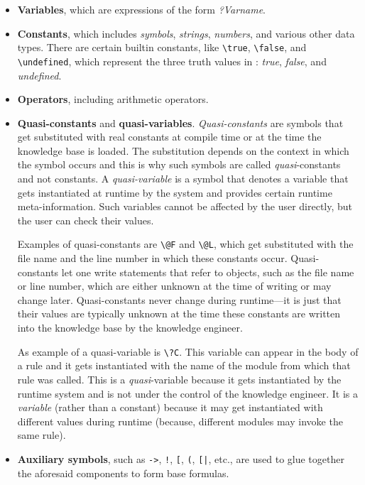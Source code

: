 \documentclass[11pt]{article}
\newcommand{\ERGO}{\mbox{\smaller{\ensuremath{\cal{E}}\smaller{{\sc{RGO}}}}}\xspace}
\newcommand{\FLSYSTEM}{\ERGO}
\newcommand{\bs}{\textbackslash}
\begin{document}
\begin{itemize}
\item  \textbf{Variables}, which are expressions of the form \emph{?Varname}.
  \index{\bs{}true}
  \index{\bs{}false}
  \index{\bs{}undefined}
\item  \textbf{Constants}, which includes \emph{symbols},  \emph{strings},
  \emph{numbers}, and various other data types.
  There are certain builtin constants, like \texttt{\bs{}true},
  \texttt{\bs{}false}, and \texttt{\bs{}undefined}, which represent the
  three truth values in \FLSYSTEM: \emph{true}, \emph{false}, and \emph{undefined}.    
\item \textbf{Operators}, including arithmetic operators.
\item \textbf{Quasi-constants} and
  \textbf{quasi-variables}. \emph{Quasi-constants}
  are symbols that get substituted
  with real constants at compile time or at the time the knowledge base is
  loaded. The substitution depends on the context in which the symbol
  occurs and this is why such symbols are called \emph{quasi}-constants and
  not constants. 
  A \emph{quasi-variable} is a symbol that denotes a variable that gets
  instantiated at runtime by the system and provides certain runtime
  meta-information. Such variables cannot be affected by the user directly,
  but the user can check their values.
  
  Examples of quasi-constants are \texttt{\bs{}@F} and \texttt{\bs{}@L},
  which get substituted with the file name and the line number in which
  these constants occur. Quasi-constants let one write
  statements that refer to objects, such as the file name or line
  number, which are either unknown at the time of writing or may change
  later.  Quasi-constants never change during runtime---it is just that
  their values are typically unknown at the time these constants are
  written into the knowledge base by the knowledge engineer.

  As example of a quasi-variable is \texttt{\bs{}?C}. This variable can
  appear in the body of a rule and it gets instantiated
  with the name of the module from which that rule was called. This is
  a \emph{quasi}-variable because it gets 
  instantiated by the runtime system and is not under the control of the
  knowledge engineer. It is a \emph{variable} (rather than a constant) because
  it may get instantiated with different values during runtime (because,
  different modules may invoke the same rule).
\item \textbf{Auxiliary symbols}, such as \texttt{->}, \texttt{!},
  \texttt{[}, \texttt{(}, \texttt{[|},   etc., are used to glue together     
  the aforesaid components to form base formulas.
\end{itemize}
\end{document}
